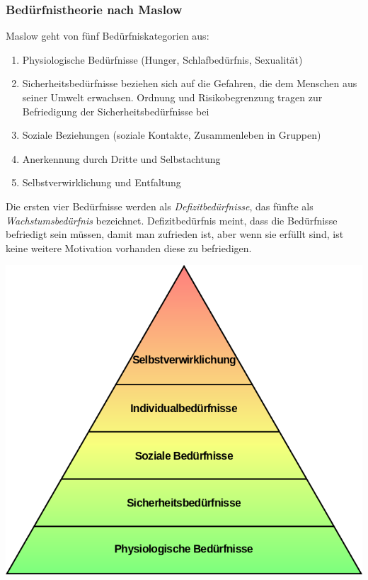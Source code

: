 \subsubsection{Bedürfnistheorie nach Maslow}

Maslow geht von fünf Bedürfniskategorien aus:
\begin{enumerate}
	\item Physiologische Bedürfnisse (Hunger, Schlafbedürfnis, Sexualität)
	\item Sicherheitsbedürfnisse beziehen sich auf die Gefahren, die dem Menschen aus seiner Umwelt erwachsen. Ordnung und Risikobegrenzung tragen zur Befriedigung der Sicherheitsbedürfnisse bei
	\item Soziale Beziehungen (soziale Kontakte, Zusammenleben in Gruppen)
	\item Anerkennung durch Dritte und Selbstachtung
	\item Selbstverwirklichung und Entfaltung
\end{enumerate}

Die ersten vier Bedürfnisse werden als {\it Defizitbedürfnisse}, das fünfte als {\it Wachstumsbedürfnis} bezeichnet. Defizitbedürfnis meint, dass die Bedürfnisse befriedigt sein müssen, damit man zufrieden ist, aber wenn sie erfüllt sind, ist keine weitere Motivation vorhanden diese zu befriedigen.

\includegraphics[scale=0.3]{1jahr_pictures/lf02-pic/lf02-maslow.png}

